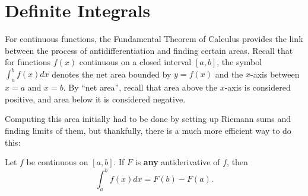 \documentclass[nooutcomes]{ximera}
\begin{document}

\section{Definite Integrals}
For continuous functions, the Fundamental Theorem of Calculus provides the link between the process of antidifferentiation and finding certain areas.  Recall that for functions $f(x)$ continuous on a closed interval $[a,b]$, the symbol $\int_a^b f(x)  dx$ denotes the net area bounded by $y=f(x)$ and the $x$-axis between $x=a$ and $x=b$.  By ``net area'', recall that area above the $x$-axis is considered positive, and area below it is considered negative.  

Computing this area initially had to be done by setting up Riemann sums and finding limits of them, but thankfully, there is a much more efficient way to do this:  


\begin{theorem}
  Let $f$ be continuous on $[a,b]$. If $F$ is \textbf{any}
  antiderivative of $f$, then
  \[
  \int_a^b f(x) dx = F(b)-F(a).
  \]
\end{theorem}
\end{document}
